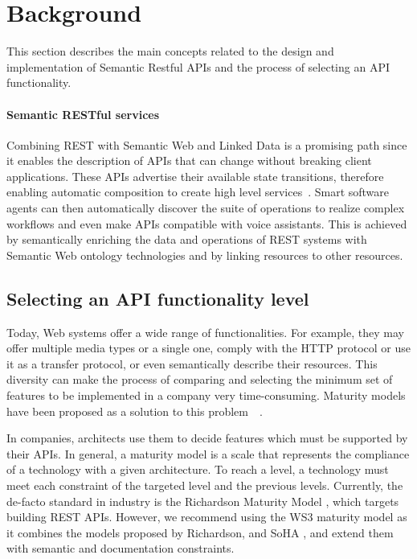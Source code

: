 \section{Background} \label{sec:background}

\vspace*{-0.2cm}

This section describes the main concepts related to the design and implementation of Semantic Restful APIs and the process of selecting an API functionality.

\paragraph{Semantic RESTful services}
Combining REST with Semantic Web and Linked Data is a promising path since it enables the description of APIs that can change without breaking client applications. These APIs advertise their available state transitions, therefore enabling automatic composition to create high level services~\cite{alarcon2015rest}. Smart software agents can then automatically discover the suite of operations to realize complex workflows and even make APIs compatible with voice assistants. This is achieved by semantically enriching the data and operations of REST systems with Semantic Web ontology technologies and by linking resources to other resources.

\subsection{Selecting an API functionality level}\label{sec:maturityLevel}

Today, Web systems offer a wide range of functionalities. For example, they may offer multiple media types or a single one, comply with the HTTP protocol or use it as a transfer protocol, or even semantically describe their resources. This diversity can make the process of comparing and selecting the minimum set of features to be implemented in a company very time-consuming. Maturity models have been proposed as a solution to this problem~\cite{paulk1993capability}~\cite{7195633}.

In companies, architects use them to decide features which must be supported by their APIs. In general, a maturity model is a scale that represents the compliance of a technology with a given architecture. To reach a level, a technology must meet each constraint of the targeted level and the previous levels.
Currently, the de-facto standard in industry is the Richardson Maturity Model \cite{RichardsonMaturityModel}, which targets building REST APIs. However, we recommend using the WS3 maturity model \cite{7195633} as it combines the models proposed by Richardson, and SoHA \cite{SoHA}, and extend them with semantic and documentation constraints.

